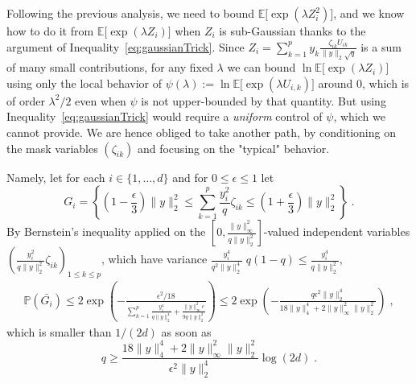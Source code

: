 \documentclass{ps}
\renewcommand{\P}{\mathbb{P}}
\newcommand{\E}{\mathbb{E}}
\newcommand{\1}{\mathbbm{1}}
\theoremstyle{plain}
\begin{document}
Following the previous analysis, we need to bound $\E\big[\exp(\lambda Z_i^2)\big]$, and we know how to do it from $\E\big[\exp(\lambda Z_i)\big]$ when $Z_i$ is sub-Gaussian thanks to the argument of Inequality~\eqref{eq:gaussianTrick}. 
Since $Z_i = \sum_{k=1}^p y_k\frac{\zeta_{ik}U_{ik}}{\|y\|_2\sqrt{q}}$ is a sum of many small contributions, for any fixed $\lambda$ we can bound $\ln \E\big[\exp(\lambda Z_i)\big]$ using only the local behavior of  $\psi(\lambda):=\ln \E\big[\exp(\lambda U_{i,k})\big]$ around $0$, which is of order $\lambda^2/2$ even when $\psi$ is not upper-bounded by that quantity. But using Inequality~\eqref{eq:gaussianTrick} would require a \emph{uniform} control of $\psi$, which we cannot provide. We are hence obliged to take another path, by conditioning on the mask variables $(\zeta_{ik})$ and focusing on the "typical" behavior. 

Namely, let for each $i\in\{1,\dots,d\}$ and for $0\leq \epsilon\leq 1$ let 
\[G_i = \left\{ \left(1-\frac{\epsilon}{3}\right)\|y\|_2^2 \leq \sum_{k=1}^p \frac{y_i^2}{q}\zeta_{ik} \leq \left(1+\frac{\epsilon}{3}\right)\|y\|_2^2 \right\} \;.\]
By Bernstein's inequality applied on the $\left[0, \frac{\|y\|_\infty^2}{q\|y\|_2^2}\right]$-valued independent variables $\left(\frac{y_i^2}{q\|y\|_2^2}\zeta_{ik}\right)_{1\leq k\leq p}$, which have variance $\frac{y_i^4}{q^2\|y\|_2^4}\;q(1-q)\leq \frac{y_i^4}{q\|y\|_2^2}$, 
\begin{align*}
\P(\bar{G_i}) \leq 2 \exp\left(-\frac{\epsilon^2 /18}{\sum_{k=1}^p \frac{y_i^4}{q\|y\|_2^4}  + \frac{\|y\|_\infty^2 \epsilon}{9q\|y\|_2^2}}\right) \leq 2\exp\left(-\frac{q\epsilon^2\|y\|_2^4}{18 \|y\|_4^4  + 2\|y\|_\infty^2\|y\|_2^2}\right)\;,
\end{align*}
which is smaller than $1/(2d)$ as soon as 
\begin{equation}\label{eq:qmin}
q\geq \frac{18 \|y\|_4^4  + 2\|y\|_\infty^2\|y\|_2^2}{\epsilon^2\|y\|_2^4} \log(2d)\;.
\end{equation}
 
\end{document}
